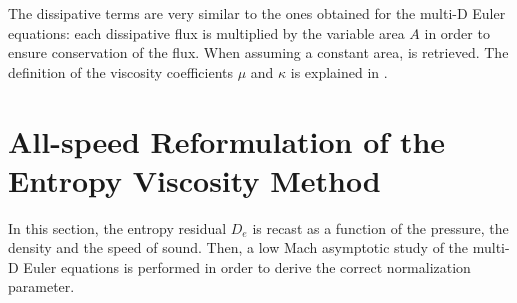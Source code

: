 The dissipative terms are very similar to the ones obtained for the multi-D Euler equations: each dissipative flux is multiplied by the variable area $A$ in order to  ensure conservation of the flux. When assuming a constant area,  is retrieved. The definition of the viscosity coefficients $\mu$ and $\kappa$ is explained in .
\section{All-speed Reformulation of the Entropy Viscosity Method} \label{sec:extension}
In this section, the entropy residual $D_e$ is recast as a function of the pressure, the density and the speed of sound. Then, a low Mach asymptotic study of the multi-D Euler equations is performed in order to derive the correct normalization parameter. 
